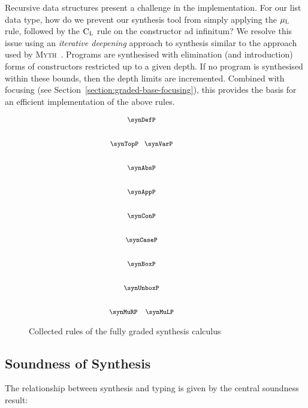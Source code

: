 Recursive data structures present a challenge in the implementation. For our
list data type, how do we prevent our synthesis tool from simply applying the
$\mu_\textsc{L}$ rule, followed by the $\textsc{C}_\textsc{L}$ rule on the
 constructor ad infinitum? We resolve this issue using an
\textit{iterative deepening} approach to synthesis similar to the approach used
by \textsc{Myth}~\citep{oserathesis}. Programs are synthesised with elimination
(and introduction) forms of constructors restricted up to a given depth. If no
program is synthesised within these bounds, then the depth limits are
incremented. Combined with focusing (see Section~\ref{section:graded-base-focusing}), this
provides the basis for an efficient implementation of the above rules.

\begin{figure}[H]
    \begin{align*}
      {\footnotesize{
    \hspace{-4em}\begin{array}{c}
      \synDefP
      \\[2.25em]
      \synTopP
      \;\;\;
      \synVarP
      \\[2.25em]
      \synAbsP
      \\[2.25em]
      \synAppP
      \\[2.25em]
      \synConP
      \\[2.25em]
      \synCaseP
      \\[2.25em]
      \synBoxP
      \\[2.25em]
      \synUnboxP
      \\[2.25em]
      \synMuRP
      \;\;\;\;
      \synMuLP
        \end{array}
      }}
      \end{align*}
    \caption{Collected rules of the fully graded synthesis calculus}
    \end{figure}


\subsection{Soundness of Synthesis}
The relationship between synthesis and typing is given by the central soundness
result: %

